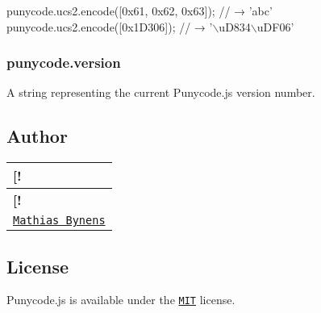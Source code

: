 \begin{DoxyCode}
punycode.ucs2.encode([0x61, 0x62, 0x63]);
// → 'abc'
punycode.ucs2.encode([0x1D306]);
// → '\(\backslash\)uD834\(\backslash\)uDF06'
\end{DoxyCode}


\subsubsection*{{\ttfamily punycode.\+version}}

A string representing the current Punycode.\+js version number.

\subsection*{Author}

\tabulinesep=1mm
\begin{longtabu} spread 0pt [c]{*{1}{|X[-1]}|}
\hline
\rowcolor{\tableheadbgcolor}\textbf{ \mbox{[}!   }\\
\endfirsthead
\hline
\endfoot
\hline
\rowcolor{\tableheadbgcolor}\textbf{ \mbox{[}!   }\\
\endhead
\href{https://mathiasbynens.be/}{\tt Mathias Bynens}   \\
\end{longtabu}


\subsection*{License}

Punycode.\+js is available under the \href{https://mths.be/mit}{\tt M\+IT} license. 